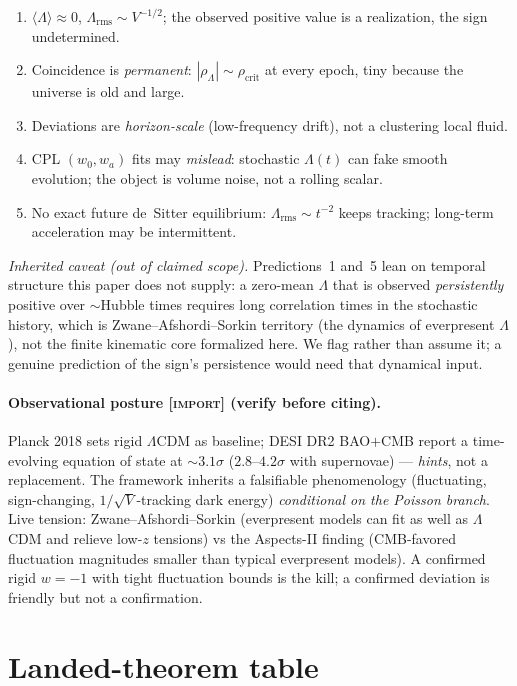 \documentclass[11pt]{article}
\newcommand{\Lam}{\Lambda}
\newcommand{\Import}{\textcolor{icol}{\textsc{[import]}}} %
\begin{document}
\begin{enumerate}[leftmargin=1.6em,itemsep=1pt]
\item $\langle\Lam\rangle\approx0$, $\Lam_{\mathrm{rms}}\sim V^{-1/2}$; the
  observed positive value is a realization, the sign undetermined.
\item Coincidence is \emph{permanent}: $|\rho_\Lam|\sim\rho_{\mathrm{crit}}$ at
  every epoch, tiny because the universe is old and large.
\item Deviations are \emph{horizon-scale} (low-frequency drift), not a
  clustering local fluid.
\item CPL $(w_0,w_a)$ fits may \emph{mislead}: stochastic $\Lam(t)$ can fake
  smooth evolution; the object is volume noise, not a rolling scalar.
\item No exact future de~Sitter equilibrium: $\Lam_{\mathrm{rms}}\sim t^{-2}$
  keeps tracking; long-term acceleration may be intermittent.
\end{enumerate}

\noindent\emph{Inherited caveat (out of claimed scope).}  Predictions~1 and~5 lean
on temporal structure this paper does not supply: a zero-mean $\Lam$ that is
observed \emph{persistently} positive over $\sim$Hubble times requires long
correlation times in the stochastic history, which is Zwane--Afshordi--Sorkin
territory (the dynamics of everpresent $\Lam$), not the finite kinematic core
formalized here.  We flag rather than assume it; a genuine prediction of the sign's
persistence would need that dynamical input.

\paragraph{Observational posture \Import{} (verify before citing).}
Planck 2018 sets rigid $\Lam$CDM as baseline; DESI DR2 BAO$+$CMB report a
time-evolving equation of state at $\sim3.1\sigma$ ($2.8$--$4.2\sigma$ with
supernovae) --- \emph{hints}, not a replacement.  The framework inherits a
falsifiable phenomenology (fluctuating, sign-changing, $1/\sqrt V$-tracking dark
energy) \emph{conditional on the Poisson branch}.  Live tension:
Zwane--Afshordi--Sorkin (everpresent models can fit as well as $\Lam$CDM and
relieve low-$z$ tensions) vs the Aspects-II finding (CMB-favored fluctuation
magnitudes smaller than typical everpresent models).  A confirmed rigid
$w=-1$ with tight fluctuation bounds is the kill; a confirmed deviation is
friendly but not a confirmation.

\section*{Landed-theorem table}
\end{document}
